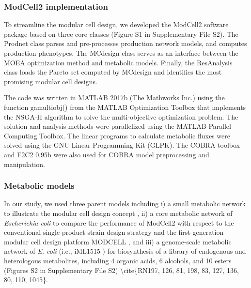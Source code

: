 \subsubsection{ModCell2 implementation}
To streamline the modular cell
design, we developed the ModCell2 software package based on three core
classes (Figure S1 in Supplementary File S2). The Prodnet class parses
and pre-processes production network models, and computes production
phenotypes. The MCdesign class serves as an interface between the MOEA
optimization method and metabolic models. Finally, the ResAnalysis class
loads the Pareto set computed by MCdesign and identifies the most
promising modular cell designs.

The code was written in MATLAB 2017b (The Mathworks Inc.) using the function gamultiobj() from the MATLAB Optimization Toolbox that implements the NSGA-II algorithm \citep{deb2002} to solve the multi-objective optimization problem.
The solution and analysis methods were parallelized using the MATLAB Parallel Computing Toolbox.
The linear programs to calculate metabolic fluxes were solved using the GNU Linear Programming Kit (GLPK).
The COBRA toolbox \citep{heirendt2017, schellenberger2011} and F2C2 0.95b \citep{larhlimi2012} were also used for COBRA model preprocessing and manipulation.

\subsubsection{Metabolic models} In our study, we used three parent
models including i) a small metabolic network to illustrate the modular
cell design concept \citep{trinh2015}, ii) a core metabolic
network of \emph{Escherichia coli} to compare the performance of
ModCell2 with respect to the conventional single-product strain design
strategy and the first-generation modular cell design platform MODCELL
\citep{trinh2015}, and iii) a genome-scale metabolic network
of \emph{E. coli} (i.e., iML1515 \citep{feist2010}) for
biosynthesis of a library of endogenous and heterologous
metabolites\emph{,} including 4 organic acids, 6 alcohols, and 10 esters
(Figures S2 in Supplementary File S2) \textbackslash{}cite\{RN197, 126,
81, 198, 83, 127, 136, 80, 110, 1045\}.

